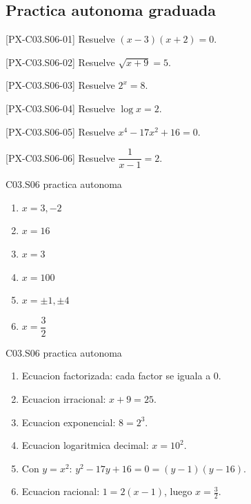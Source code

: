 \subsection*{Practica autonoma graduada}
\begin{exercise}{[PX-C03.S06-01] Resuelve \((x-3)(x+2)=0\).}
\end{exercise}
\begin{exercise}{[PX-C03.S06-02] Resuelve \(\sqrt{x+9}=5\).}
\end{exercise}
\begin{exercise}{[PX-C03.S06-03] Resuelve \(2^x=8\).}
\end{exercise}
\begin{exercise}{[PX-C03.S06-04] Resuelve \(\log x=2\).}
\end{exercise}
\begin{exercise}{[PX-C03.S06-05] Resuelve \(x^4-17x^2+16=0\).}
\end{exercise}
\begin{exercise}{[PX-C03.S06-06] Resuelve \(\dfrac{1}{x-1}=2\).}
\end{exercise}

\begin{shortanswer}{C03.S06 practica autonoma}
\begin{enumerate}[label=\textbf{PX-C03.S06-\arabic*:}, leftmargin=*]
  \item \(x=3,-2\)
  \item \(x=16\)
  \item \(x=3\)
  \item \(x=100\)
  \item \(x=\pm 1,\pm 4\)
  \item \(x=\dfrac{3}{2}\)
\end{enumerate}
\end{shortanswer}

\begin{fullsolution}{C03.S06 practica autonoma}
\begin{enumerate}[label=\textbf{PX-C03.S06-\arabic*:}, leftmargin=*]
  \item Ecuacion factorizada: cada factor se iguala a \(0\).
  \item Ecuacion irracional: \(x+9=25\).
  \item Ecuacion exponencial: \(8=2^3\).
  \item Ecuacion logaritmica decimal: \(x=10^2\).
  \item Con \(y=x^2\): \(y^2-17y+16=0=(y-1)(y-16)\).
  \item Ecuacion racional: \(1=2(x-1)\), luego \(x=\tfrac{3}{2}\).
\end{enumerate}
\end{fullsolution}

